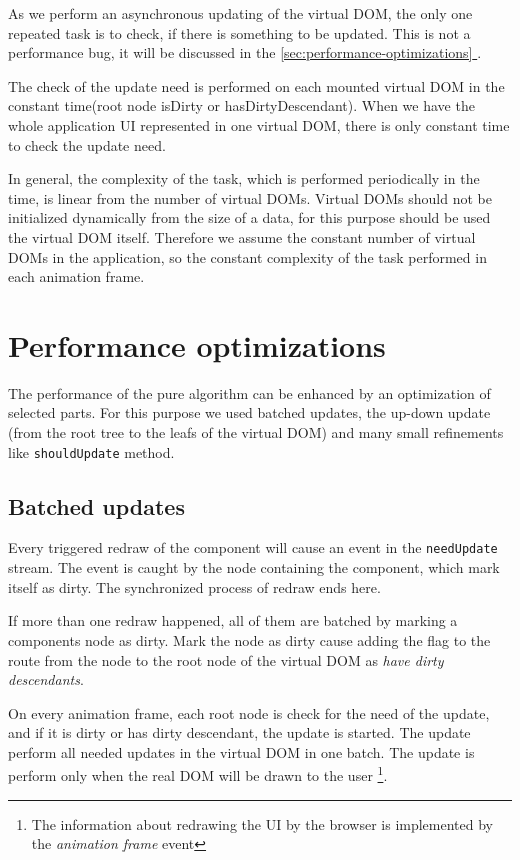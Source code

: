 \documentclass[oneside, 12pt]{book}
\newcommand*{\fullref}[1]{\hyperref[{#1}]{\autoref*{#1} \nameref*{#1}}}
\begin{document}
    As we perform an asynchronous updating of the virtual DOM, the only one repeated task is to check, 
    if there is something to be updated. This is not a performance bug, it will be discussed in the \fullref{sec:performance-optimizations}.

    The check of the update need is performed on each mounted virtual DOM in the constant time(root node isDirty or hasDirtyDescendant). 
    When we have the whole application UI represented in one virtual DOM, there is only constant time to check the update need. 

    In general, the complexity of the task, which is performed periodically in the time, is linear from the number of virtual DOMs. 
    Virtual DOMs should not be initialized dynamically from the size of a data, for this purpose should be used the virtual DOM itself.
    Therefore we assume the constant number of virtual DOMs in the application, 
    so the constant complexity of the task performed in each animation frame.

  \section{Performance optimizations}\label{sec:performance-optimizations}
    
    The performance of the pure algorithm can be enhanced by an optimization of selected parts. 
    For this purpose we used batched updates, the up-down update (from the root tree to the leafs of the virtual DOM) 
    and many small refinements like \texttt{shouldUpdate} method. 

    \subsection{Batched updates}\label{sec:performance-optimizations-batched-updates}
   
      Every triggered redraw of the component will cause an event in the \texttt{needUpdate} stream. 
      The event is caught by the node containing the component, which mark itself as dirty. The synchronized process of redraw ends here. 

      If more than one redraw happened, all of them are batched by marking a components node as dirty.
      Mark the node as dirty cause adding the flag to the route from the node to the root node of the virtual DOM as \textit{have dirty descendants}.

      On every animation frame, each root node is check for the need of the update, and if it is dirty or has dirty descendant, the update is started.
      The update perform all needed updates in the virtual DOM in one batch.
      The update is perform only when the real DOM will be drawn to the user
      \footnote{The information about redrawing the UI by the browser is implemented by the \textit{animation frame} event}. 
\end{document}
